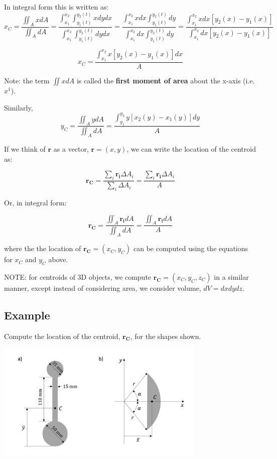 \documentclass[12pt,letterpaper,twoside]{report}
\begin{document}
In integral form this is written as:
\[
x_C = \frac{\displaystyle  \iint_A x dA }{\displaystyle \iint_A dA} = \frac{\displaystyle \int_{x_1}^{{x_2}} \int_{y_1(t)}^{{y_2(t)}} x dy dx}{\displaystyle \int_{x_1}^{{x_2}} \int_{y_1(t)}^{{y_2(t)}} dy dx} = \frac{\displaystyle \int_{x_1}^{{x_2}} x dx \int_{y_1(t)}^{{y_2(t)}} dy}{\displaystyle \int_{x_1}^{{x_2}} dx \int_{y_1(t)}^{{y_2(t)}} dy} = \frac{\displaystyle \int_{x_1}^{{x_2}} x dx [y_2(x) - y_1(x)]}{\displaystyle \int_{x_1}^{{x_2}} dx [y_2(x) - y_1(x)]}
\]

\[
x_C =\frac{\displaystyle \int_{x_1}^{{x_2}} x [y_2(x) - y_1(x)] dx}{A}
\]

\vspace*{10\baselineskip}

Note: the term $\displaystyle  \iint x dA$ is called the \textbf{first moment of area} about the x-axis (i.e. $x^1$). 

Similarly, 
\[
y_C = \frac{\displaystyle \iint_A y dA }{\displaystyle \iint_A dA}=\frac{\displaystyle \int_{y_1}^{{y_2}} y [x_2(y) - x_1(y)] dy}{A}
\]

If we think of $\bm{r}$ as a vector, $\bm{r}=(x,y)$, we can write the location of the centroid as:

\[
\bm{r_C} =\frac{\displaystyle  \sum_{i} \bm{r_i} \Delta A_i}{\displaystyle \sum_{i} \Delta A_i} = \frac{\displaystyle  \sum_{i} \bm{r_i} \Delta A_i}{A} 
\]

Or, in integral form: 

\[
\bm{r_C} =\frac{\displaystyle \iint_A \bm{r_i} dA}{\displaystyle \iint_A dA} = \frac{\displaystyle  \iint_A \bm{r_i} dA}{A} 
\]

where the the location of $\bm{r_C} =(x_C,y_C)$ can be computed using the equations for $x_C$ and $y_C$ above. 

NOTE:  for centroids of 3D objects, we compute $\bm{r_C} =(x_C,y_C,z_C)$ in a similar manner, except instead of considering area, we consider volume, $dV=dxdydz$.  

\subsection{Example}
Compute the location of the centroid, $\bm{r_C}$, for the shapes shown.

\includegraphics[trim={1cm 0cm 1cm 0cm},clip,width=0.75\textwidth, left]{Slide36}
\newpage
\end{document}
